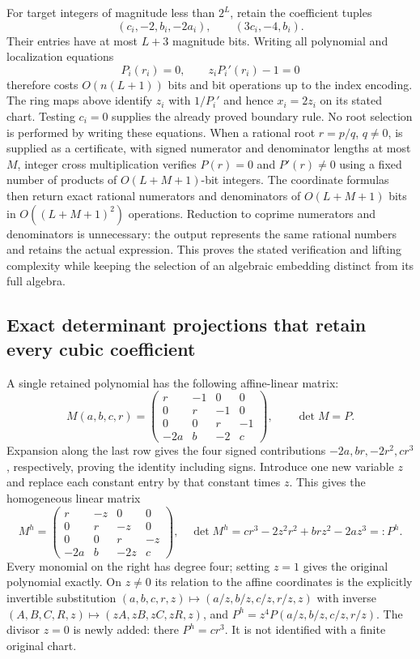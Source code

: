 For target integers of magnitude less than $2^L$, retain the coefficient
tuples\[
 (c_i,-2,b_i,-2a_i),\qquad (3c_i,-4,b_i).
\]
Their entries have at most $L+3$ magnitude bits. Writing all polynomial
and localization equations
\[
 P_i(r_i)=0,\qquad z_iP_i'(r_i)-1=0
\]
therefore costs $O(n(L+1))$ bits and bit operations up to the index
encoding. The ring maps above identify $z_i$ with $1/P_i'$ and hence
$x_i=2z_i$ on its stated chart. Testing $c_i=0$ supplies the already
proved boundary rule. No root selection is performed by writing these
equations. When a rational root $r=p/q$, $q\ne0$, is supplied as a
certificate, with signed numerator and denominator lengths at most $M$,
integer cross multiplication verifies $P(r)=0$ and $P'(r)\ne0$ using
a fixed number of products of $O(L+M+1)$-bit integers. The coordinate
formulas then return exact rational numerators and denominators of
$O(L+M+1)$ bits in $O((L+M+1)^2)$ operations. Reduction to coprime
numerators and denominators is unnecessary: the output represents the
same rational numbers and retains the actual expression. This proves
the stated verification and lifting complexity while keeping the
selection of an algebraic embedding distinct from its full algebra.

\subsection{Exact determinant projections that retain every cubic coefficient}

A single retained polynomial has the following affine-linear matrix:
\[
 M(a,b,c,r)=\begin{pmatrix}
 r&-1&0&0\\0&r&-1&0\\0&0&r&-1\\-2a&b&-2&c
 \end{pmatrix},\qquad \det M=P.
\]
Expansion along the last row gives the four signed contributions
$-2a,br,-2r^2,cr^3$, respectively, proving the identity including signs.
Introduce one new variable $z$ and replace each constant entry by that
constant times $z$. This gives the homogeneous linear matrix
\[
 M^h=\begin{pmatrix}
 r&-z&0&0\\0&r&-z&0\\0&0&r&-z\\-2a&b&-2z&c
 \end{pmatrix},
 \quad \det M^h=cr^3-2z^2r^2+brz^2-2az^3=:P^h.
\]
Every monomial on the right has degree four; setting $z=1$ gives the
original polynomial exactly. On $z\ne0$ its relation to the affine
coordinates is the explicitly invertible substitution
$(a,b,c,r,z)\mapsto(a/z,b/z,c/z,r/z,z)$ with inverse
$(A,B,C,R,z)\mapsto(zA,zB,zC,zR,z)$, and
$P^h=z^4P(a/z,b/z,c/z,r/z)$. The divisor $z=0$ is newly added:
there $P^h=cr^3$. It is not identified with a finite original chart.

